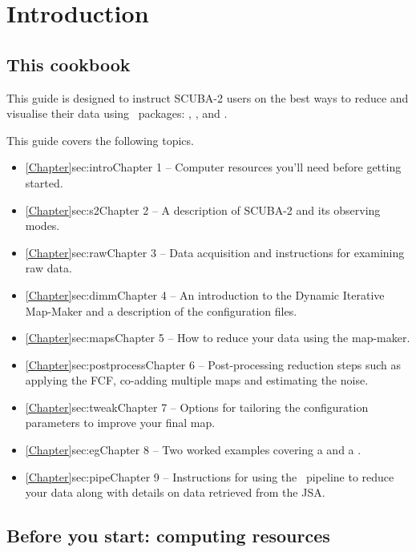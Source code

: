 \documentclass[11pt,oneside,chapters]{starlink}
\begin{document}
\chapter{Introduction}
\label{sec:intro}
\renewcommand{\thepage}{\arabic{page}}
\setcounter{page}{1}

\section{This cookbook}

This guide is designed to instruct SCUBA-2 users on the best ways to
reduce and visualise their data using \starlink\ packages:
\smurf \cite{smurf}, \Kappa \cite{kappa}, \gaia \cite{gaia} and \picard
\cite{picard}.

This guide covers the following topics.
\begin{itemize}
\itemsep0em
\item \cref{Chapter}{sec:intro}{Chapter 1} -- Computer resources you'll need before getting started.
\item \cref{Chapter}{sec:s2}{Chapter 2} -- A description of SCUBA-2 and its observing modes.
\item \cref{Chapter}{sec:raw}{Chapter 3}  -- Data acquisition and instructions for examining raw data.
\item \cref{Chapter}{sec:dimm}{Chapter 4}  -- An introduction to the Dynamic Iterative Map-Maker and a description of the configuration files.
\item \cref{Chapter}{sec:maps}{Chapter 5}  -- How to reduce your data using the map-maker.
\item \cref{Chapter}{sec:postprocess}{Chapter 6}  -- Post-processing reduction steps such as applying the FCF, co-adding multiple maps and estimating the noise.
\item \cref{Chapter}{sec:tweak}{Chapter 7}  -- Options for tailoring the configuration parameters to improve your final map.
\item \cref{Chapter}{sec:eg}{Chapter 8}  -- Two worked examples covering a  and a .
\item \cref{Chapter}{sec:pipe}{Chapter 9}  -- Instructions for using the \oracdr\ pipeline to reduce your data along with details on data retrieved from the JSA.
\end{itemize}


\section{ Before you start: computing resources}
\end{document}
